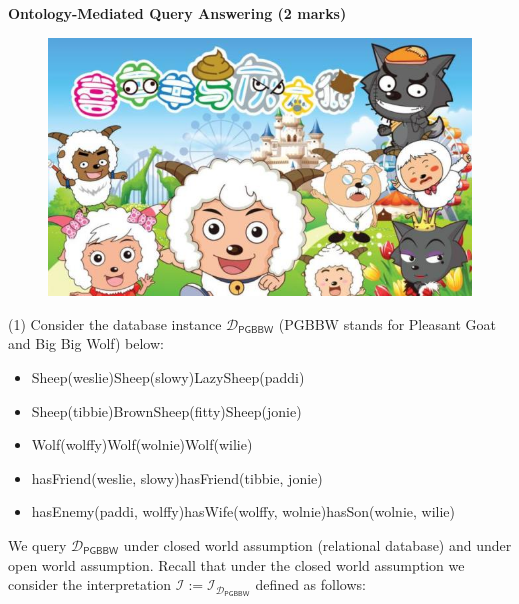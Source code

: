 \documentclass[12pt,a4paper]{article}
\newenvironment{problem}[2][{\color{red}Question}]{\begin{trivlist}
\item[\hskip \labelsep {\bfseries #1}\hskip \labelsep {\bfseries #2.}]}{\end{trivlist}}
\begin{document}
\begin{problem}{{\color{red}1}}
\textbf{Ontology-Mediated Query Answering (2 marks)}\\
\begin{figure}[ht]
    \centering
    \includegraphics[width=0.6\columnwidth]{PGBBW.jpeg}
     \label{pic1}
\end{figure}
(1) Consider the database instance $\mathcal{D}_{\textsf{PGBBW}}$ (\textsf{PGBBW} stands for \textsf{Pleasant Goat and Big Big Wolf}) below:

\begin{itemize}
    \item[] \textsf{Sheep(weslie)}\quad\textsf{Sheep(slowy)}\quad\textsf{LazySheep(paddi)}
    \item[] \textsf{Sheep(tibbie)}\quad\textsf{BrownSheep(fitty)}\quad\textsf{Sheep(jonie)}
    \item[] \textsf{Wolf(wolffy)}\quad\textsf{Wolf(wolnie)}\quad\textsf{Wolf(wilie)}
    \item[] \textsf{hasFriend(weslie, slowy)}\quad\textsf{hasFriend(tibbie, jonie)}
    \item[] \textsf{hasEnemy(paddi, wolffy)}\quad\textsf{hasWife(wolffy, wolnie)}\quad\textsf{hasSon(wolnie, wilie)}
\end{itemize}


\noindent We query $\mathcal{D}_{\textsf{PGBBW}}$ under closed world assumption (relational database) and under open world assumption. Recall that under the closed world assumption we consider the interpretation $\mathcal{I}:=\mathcal{I}_{\mathcal{D}_{\textsf{PGBBW}}}$ defined as follows:


\end{problem}
\end{document}

